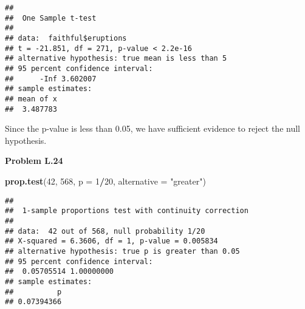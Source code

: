 \documentclass[
]{article}
\newenvironment{Shaded}{\begin{snugshade}}{\end{snugshade}}
\newcommand{\AttributeTok}[1]{\textcolor[rgb]{0.13,0.29,0.53}{#1}}
\newcommand{\DecValTok}[1]{\textcolor[rgb]{0.00,0.00,0.81}{#1}}
\newcommand{\FunctionTok}[1]{\textcolor[rgb]{0.13,0.29,0.53}{\textbf{#1}}}
\newcommand{\NormalTok}[1]{#1}
\newcommand{\SpecialCharTok}[1]{\textcolor[rgb]{0.81,0.36,0.00}{\textbf{#1}}}
\newcommand{\StringTok}[1]{\textcolor[rgb]{0.31,0.60,0.02}{#1}}
\begin{document}
\begin{verbatim}
## 
##  One Sample t-test
## 
## data:  faithful$eruptions
## t = -21.851, df = 271, p-value < 2.2e-16
## alternative hypothesis: true mean is less than 5
## 95 percent confidence interval:
##      -Inf 3.602007
## sample estimates:
## mean of x 
##  3.487783
\end{verbatim}

Since the p-value is less than 0.05, we have sufficient evidence to
reject the null hypothesis.

\textbf{Problem L.24}

\begin{Shaded}
\begin{Highlighting}[]
\FunctionTok{prop.test}\NormalTok{(}\DecValTok{42}\NormalTok{, }\DecValTok{568}\NormalTok{, }\AttributeTok{p =} \DecValTok{1}\SpecialCharTok{/}\DecValTok{20}\NormalTok{, }\AttributeTok{alternative =} \StringTok{"greater"}\NormalTok{)}
\end{Highlighting}
\end{Shaded}

\begin{verbatim}
## 
##  1-sample proportions test with continuity correction
## 
## data:  42 out of 568, null probability 1/20
## X-squared = 6.3606, df = 1, p-value = 0.005834
## alternative hypothesis: true p is greater than 0.05
## 95 percent confidence interval:
##  0.05705514 1.00000000
## sample estimates:
##          p 
## 0.07394366
\end{verbatim}
\end{document}
